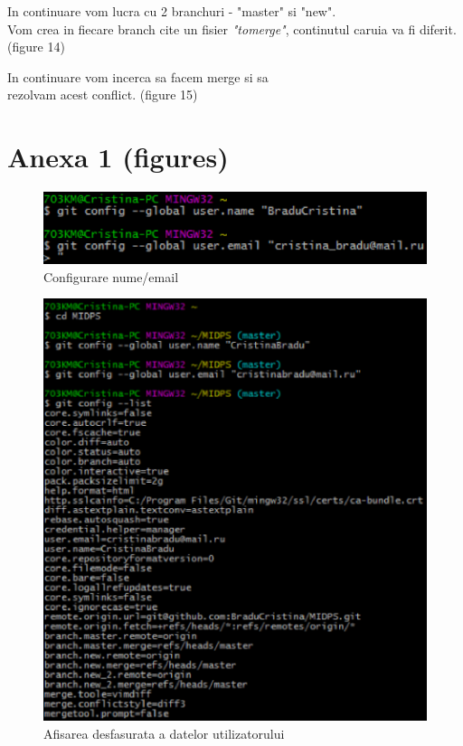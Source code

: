 \documentclass[11pt]{article}
\begin{document}
In continuare vom lucra cu 2 branchuri - "master" si "new".
\\Vom crea in fiecare branch cite un fisier \textit{"tomerge"},
continutul caruia va fi diferit.(figure 14)

In continuare vom incerca sa facem merge si sa 
\\rezolvam acest conflict. (figure 15)

\section{Anexa 1 (figures)}
\begin{figure}[h]
\includegraphics{images/1.eps}
\caption{Configurare nume/email}
\end{figure}

\begin{figure}[h]
\includegraphics{images/5.eps}
\caption{Afisarea desfasurata a datelor utilizatorului}
\end{figure}
\end{document}
